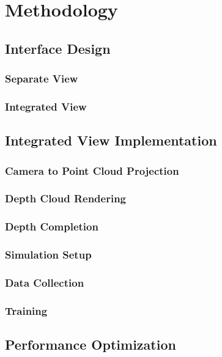 
\chapter{Methodology}\label{chapter:methodology}

\section{Interface Design}
\subsection{Separate View}
\subsection{Integrated View}

\section{Integrated View Implementation}
\subsection{Camera to Point Cloud Projection}
\subsection{Depth Cloud Rendering}
\subsection{Depth Completion}
\subsection{Simulation Setup}
\subsection{Data Collection}

\subsection{Training}

\section{Performance Optimization}
